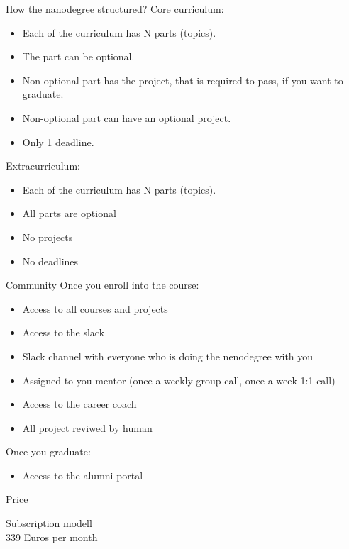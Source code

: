\documentclass{beamer}
\begin{document}
\begin{frame}{How the nanodegree structured?}
Core curriculum:
\begin{itemize}
\item Each of the curriculum has N parts (topics).
\item The part can be optional.
\item Non-optional part has the project, that is required to pass, if you want to graduate.
\item Non-optional part can have an optional project.
\item Only 1 deadline.
\end{itemize}
\vfill
Extracurriculum:
\begin{itemize}
\item Each of the curriculum has N parts (topics).
\item All parts are optional
\item No projects
\item No deadlines
\end{itemize}
\end{frame}

\begin{frame}{Community}
Once you enroll into the course:
\begin{itemize}
\item Access to all courses and projects
\item Access to the slack
\item Slack channel with everyone who is doing the nenodegree with you
\item Assigned to you mentor (once a weekly group call, once a week 1:1 call)
\item Access to the career coach
\item All project reviwed by human
\end{itemize}
\vfill
Once you graduate:
\begin{itemize}
\item Access to the alumni portal
\end{itemize}
\end{frame}

\begin{frame}{Price}
\begin{center}
\begin{Huge}
Subscription modell\\
339 Euros per month
\end{Huge}
\end{center}
\end{frame}
\end{document}
